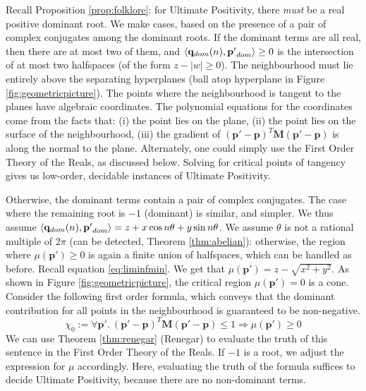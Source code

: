 Recall Proposition \ref{prop:folklore}: for Ultimate Positivity, there \textit{must} be a real positive dominant root. We make cases, based on the presence of a pair of complex conjugates among the dominant roots. If the dominant terms are all real, then there are at most two of them, and $\langle\mathbf{q}_{dom}(n), \mathbf{p'}_{dom}\rangle \ge 0$ is the intersection of at most two halfspaces (of the form $z - |w| \ge 0$). The neighbourhood must lie entirely above the separating hyperplanes (ball atop hyperplane in Figure \ref{fig:geometricpicture}). The points where the neighbourhood is tangent to the planes have algebraic coordinates. The polynomial equations for the coordinates come from the facts that: (i) the point lies on the plane, (ii) the point lies on the surface of the neighbourhood, (iii) the gradient of $(\mathbf{p'} - \mathbf{p})^T\mathbf{M}(\mathbf{p'} - \mathbf{p})$ is along the normal to the plane. Alternately, one could simply use the First Order Theory of the Reals, as discussed below. Solving for critical points of tangency gives us low-order, decidable instances of Ultimate Positivity.

Otherwise, the dominant terms contain a pair of complex conjugates. The case where the remaining root is $-1$ (dominant) is similar, and simpler. We thus assume $\langle\mathbf{q}_{dom}(n), \mathbf{p'}_{dom}\rangle = z + x\cos n\theta + y\sin n\theta$. We assume $\theta$ is not a rational multiple of $2\pi$ (can be detected, Theorem \ref{thm:abelian}): otherwise, the region where $\mu(\mathbf{p'}) \ge 0$ is again a finite union of halfspaces, which can be handled as before. Recall equation \ref{eq:liminfmin}. We get that $\mu(\mathbf{p'}) = z -\sqrt{x^2 + y^2}$. As shown in Figure \ref{fig:geometricpicture}, the critical region $\mu(\mathbf{p'}) = 0$ is a cone. Consider the following first order formula, which conveys that the dominant contribution for all points in the neighbourhood is guaranteed to be non-negative.
\begin{equation}
\label{eq:firsttask}
\chi_0 := \forall \mathbf{p'}.~ (\mathbf{p'} - \mathbf{p})^T\mathbf{M}(\mathbf{p'} - \mathbf{p}) \le 1 \Rightarrow \mu(\mathbf{p'}) \ge 0
\end{equation}
We can use Theorem \ref{thm:renegar} (Renegar) to evaluate the truth of this sentence in the First Order Theory of the Reals. If $-1$ is a root, we adjust the expression for $\mu$ accordingly. Here, evaluating the truth of the formula suffices to decide Ultimate Positivity, because there are no non-dominant terms.

